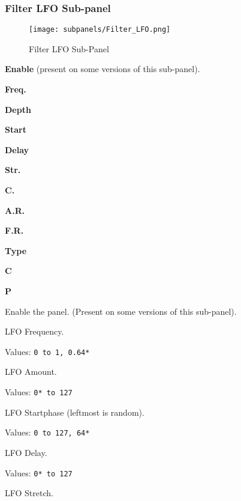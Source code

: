 \subsubsection{Filter LFO Sub-panel}
\label{subsubsec:filter_lfo_sub_panel}


\begin{figure}[H]
   \centering 
   \texttt{[image: subpanels/Filter\_LFO.png]}
   \caption[Filter LFO Sub-Panel]{Filter LFO Sub-Panel}
   \label{fig:filter_lfo}
\end{figure}

   \begin{enumber}
      \item \textbf{Enable} (present on some versions of this sub-panel).
      \item \textbf{Freq.}
      \item \textbf{Depth}
      \item \textbf{Start}
      \item \textbf{Delay}
      \item \textbf{Str.}
      \item \textbf{C.}
      \item \textbf{A.R.}
      \item \textbf{F.R.}
      \item \textbf{Type}
      \item \textbf{C}
      \item \textbf{P}
   \end{enumber}

   \setcounter{ItemCounter}{0}      %

   Enable the panel.  (Present on some versions of this sub-panel).

   LFO Frequency.

   Values: \texttt{0 to 1, 0.64*}

   LFO Amount.

   Values: \texttt{0* to 127}

   LFO Startphase (leftmost is random).

   Values: \texttt{0 to 127, 64*}

   LFO Delay.

   Values: \texttt{0* to 127}

   LFO Stretch.

